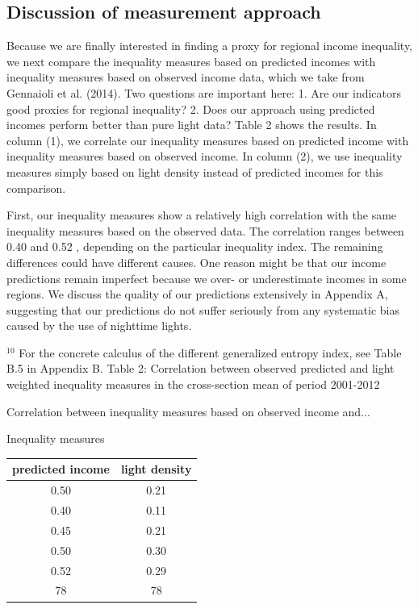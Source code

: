 \documentclass[10pt]{article}
\begin{document}
\subsection{Discussion of measurement approach}
Because we are finally interested in finding a proxy for regional income inequality, we next compare the inequality measures based on predicted incomes with inequality measures based on observed income data, which we take from Gennaioli et al. (2014). Two questions are important here: 1. Are our indicators good proxies for regional inequality? 2. Does our approach using predicted incomes perform better than pure light data? Table 2 shows the results. In column (1), we correlate our inequality measures based on predicted income with inequality measures based on observed income. In column (2), we use inequality measures simply based on light density instead of predicted incomes for this comparison.

First, our inequality measures show a relatively high correlation with the same inequality measures based on the observed data. The correlation ranges between 0.40 and 0.52 , depending on the particular inequality index. The remaining differences could have different causes. One reason might be that our income predictions remain imperfect because we over- or underestimate incomes in some regions. We discuss the quality of our predictions extensively in Appendix A, suggesting that our predictions do not suffer seriously from any systematic bias caused by the use of nighttime lights.

${ }^{10}$ For the concrete calculus of the different generalized entropy index, see Table B.5 in Appendix B. Table 2: Correlation between observed predicted and light weighted inequality measures in the cross-section mean of period 2001-2012

Correlation between inequality measures based on observed income and...

Inequality measures

\begin{center}
\begin{tabular}{cc}
predicted income & light density \\
\hline
0.50 & 0.21 \\
0.40 & 0.11 \\
0.45 & 0.21 \\
0.50 & 0.30 \\
0.52 & 0.29 \\
78 & 78 \\
\end{tabular}
\end{center}
\end{document}
